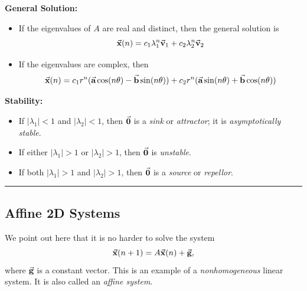 \medskip
\noindent
\textbf{General Solution:}
\begin{itemize}
\item If the eigenvalues of $A$ are real and distinct, then the
general solution is
\begin{equation}
   \vec{\textbf{x}}(n) = c_1 \lambda_1^n \vec{\textbf{v}}_1 + c_2 \lambda_2^n \vec{\textbf{v}}_2
\end{equation}
\item If the eigenvalues are complex, then
\begin{equation}
  \vec{\textbf{x}}(n) =    c_1 r^n(\vec{\textbf{a}}\cos(n\theta)-\vec{\textbf{b}}\sin(n\theta))
           + c_2 r^n(\vec{\textbf{a}}\sin(n\theta)+\vec{\textbf{b}}\cos(n\theta))
\label{eqn:linear2dcomplexgensol}
\end{equation}
\end{itemize}

\noindent
\textbf{Stability:}
\begin{itemize}
\item If $|\lambda_1| < 1$ and $|\lambda_2| < 1$, then
$\vec{\textbf{0}}$ is a \emph{sink} or \emph{attractor}; it is
\emph{asymptotically stable}.
\item If either $|\lambda_1| > 1$ or $|\lambda_2|>1$, then
$\vec{\textbf{0}}$ is \emph{unstable}.
\item If both $|\lambda_1| > 1$ and $|\lambda_2|>1$, then
$\vec{\textbf{0}}$ is a \emph{source} or \emph{repellor}.
\end{itemize}

\medskip

\hrule

\medskip
\subsection*{Affine 2D Systems}
We point out here that it is no harder to solve the
system
\begin{equation}
  \vec{\textbf{x}}(n+1) = A\vec{\textbf{x}}(n) + \vec{\textbf{g}},
  \label{eqn:affine}
\end{equation}
where $\vec{\textbf{g}}$ is a constant vector.
This is an example of a \emph{nonhomogeneous}
linear system.  It is also called an \emph{affine system}.

